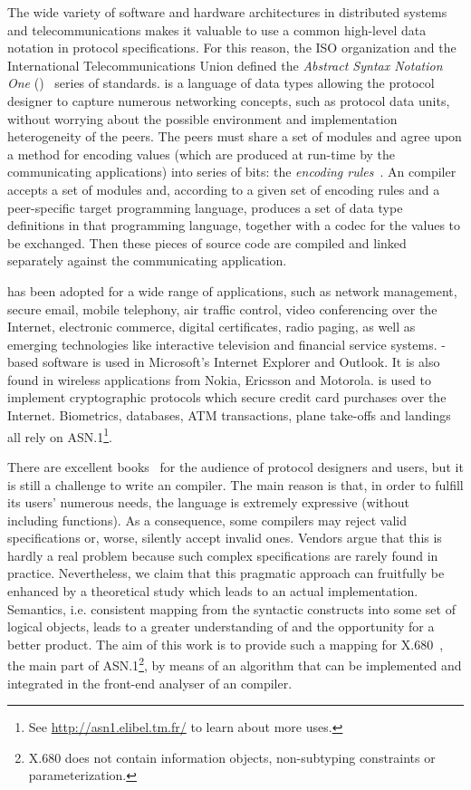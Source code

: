 
The wide variety of software and hardware architectures in distributed
systems and telecommunications makes it valuable to use a common
high-level data notation in protocol specifications. For this reason,
the ISO organization and the International Telecommunications Union
defined the \emph{Abstract Syntax Notation One}
(\ASN)~\cite{X.680:2002,X.681:2002,X.682:2002,X.683:2002} series of
standards. \ASN is a language of data types allowing the protocol
designer to capture numerous networking concepts, such as protocol
data units, without worrying about the possible environment and
implementation heterogeneity of the peers. The peers must share a set
of \ASN modules and agree upon a method for encoding values (which are
produced at run-time by the communicating applications) into series of
bits: the \emph{encoding rules}~\cite{X.690:2002, X.691:2002}. An \ASN
compiler accepts a set of \ASN modules and, according to a given set
of encoding rules and a peer-specific target programming language,
produces a set of data type definitions in that programming language,
together with a codec for the values to be exchanged. Then these
pieces of source code are compiled and linked separately against the
communicating application.

\ASN has been adopted for a wide range of applications, such as
network management, secure email, mobile telephony, air traffic
control, video conferencing over the Internet, electronic commerce,
digital certificates, radio paging, as well as emerging technologies
like interactive television and financial service systems. \ASN-based
software is used in Microsoft's Internet Explorer and Outlook. It is
also found in wireless applications from Nokia, Ericsson and
Motorola. \ASN is used to implement cryptographic protocols which
secure credit card purchases over the Internet. Biometrics, databases,
ATM transactions, plane take-offs and landings all rely on
\mbox{ASN.1}\footnote{See \url{http://asn1.elibel.tm.fr/} to learn
about more uses.}.

There are excellent books~\cite{Dubuisson:2000,Larmouth:2000} for the
audience of protocol designers and users, but it is still a challenge
to write an \ASN compiler. The main reason is that, in order to
fulfill its users' numerous needs, the language is extremely
expressive (without including functions). As a consequence, some
compilers may reject valid specifications or, worse, silently accept
invalid ones. Vendors argue that this is hardly a real problem because
such complex specifications are rarely found in
practice. Nevertheless, we claim that this pragmatic approach can
fruitfully be enhanced by a theoretical study which leads to an actual
implementation. Semantics, i.e. consistent mapping from the
syntactic constructs into some set of logical objects, leads to a
greater understanding of \ASN and the opportunity for a better
product. The aim of this work is to provide such a mapping for
\mbox{X.680}~\cite{X.680:2002}, the main part of
\mbox{ASN.1}\footnote{\mbox{X.680} does not contain information
objects, non-subtyping constraints or parameterization.}, by means of
an algorithm that can be implemented and integrated in the front-end
analyser of an \ASN compiler.

